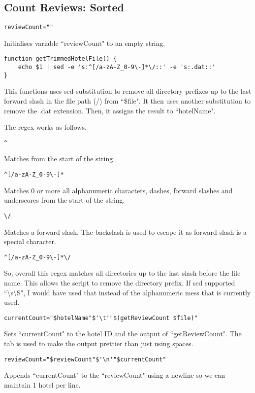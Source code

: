 \documentclass[a4paper]{article}
\begin{document}
%
\subsection{Count Reviews: Sorted}
\begin{lstlisting}
reviewCount=""
\end{lstlisting}
Initialises variable ``reviewCount" to an empty string.

\begin{lstlisting}
function getTrimmedHotelFile() {
	echo $1 | sed -e 's:^[/a-zA-Z_0-9\-]*\/::' -e 's:.dat::'
}
\end{lstlisting}
This functions uses sed substitution to remove all directory prefixes up to the last forward slash in the file path (/) from ``\$file".
It then uses another substitution to remove the .dat extension.
Then, it assigns the result to ``hotelName".

The regex works as follows.
\begin{lstlisting}
^
\end{lstlisting}
Matches from the start of the string
\begin{lstlisting}
^[/a-zA-Z_0-9\-]*
\end{lstlisting}
Matches 0 or more all alphanumeric characters, dashes, forward slashes and underscores from the start of the string.
\begin{lstlisting}
\/
\end{lstlisting}
Matches a forward slash. The backslash is used to escape it as forward slash is a special character.

\begin{lstlisting}
^[/a-zA-Z_0-9\-]*\/
\end{lstlisting}
So, overall this regex matches all directories up to the last slash before the file name.
This allows the script to remove the directory prefix.
If sed supported ``\textbackslash s\textbackslash S", I would have used that instead of the alphanumeric mess that is currently used.

\begin{lstlisting}
currentCount="$hotelName"$'\t'"$(getReviewCount $file)"
\end{lstlisting}
Sets ``currentCount" to the hotel ID and the output of ``getReviewCount".
The tab is used to make the output prettier than just using spaces.

\begin{lstlisting}
reviewCount="$reviewCount"$'\n'"$currentCount"
\end{lstlisting}
Appends ``currentCount" to the ``reviewCount" using a newline so we can maintain 1 hotel per line.
\end{document}
